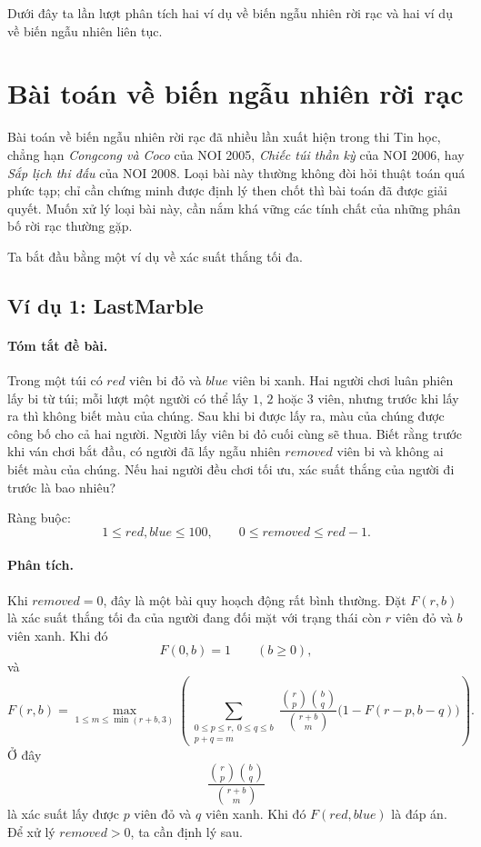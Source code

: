 \documentclass[11pt]{article}
\begin{document}
Dưới đây ta lần lượt phân tích hai ví dụ về biến ngẫu nhiên rời rạc và hai ví
dụ về biến ngẫu nhiên liên tục.

\section{Bài toán về biến ngẫu nhiên rời rạc}

Bài toán về biến ngẫu nhiên rời rạc đã nhiều lần xuất hiện trong thi Tin học,
chẳng hạn \emph{Congcong và Coco} của NOI 2005, \emph{Chiếc túi thần kỳ} của
NOI 2006, hay \emph{Sắp lịch thi đấu} của NOI 2008. Loại bài này thường không
đòi hỏi thuật toán quá phức tạp; chỉ cần chứng minh được định lý then chốt thì
bài toán đã được giải quyết. Muốn xử lý loại bài này, cần nắm khá vững các
tính chất của những phân bố rời rạc thường gặp.

Ta bắt đầu bằng một ví dụ về xác suất thắng tối đa.

\subsection{Ví dụ 1: LastMarble}

\paragraph{Tóm tắt đề bài.}
Trong một túi có \(\mathit{red}\) viên bi đỏ và \(\mathit{blue}\) viên bi
xanh. Hai người chơi luân phiên lấy bi từ túi; mỗi lượt một người có thể lấy
\(1\), \(2\) hoặc \(3\) viên, nhưng trước khi lấy ra thì không biết màu của
chúng. Sau khi bi được lấy ra, màu của chúng được công bố cho cả hai người.
Người lấy viên bi đỏ cuối cùng sẽ thua. Biết rằng trước khi ván chơi bắt đầu,
có người đã lấy ngẫu nhiên \(\mathit{removed}\) viên bi và không ai biết màu
của chúng. Nếu hai người đều chơi tối ưu, xác suất thắng của người đi trước là
bao nhiêu?

Ràng buộc:
\[
  1\le \mathit{red},\mathit{blue}\le 100,\qquad
  0\le \mathit{removed}\le \mathit{red}-1.
\]

\paragraph{Phân tích.}
Khi \(\mathit{removed}=0\), đây là một bài quy hoạch động rất bình thường.
Đặt \(F(r,b)\) là xác suất thắng tối đa của người đang đối mặt với trạng thái
còn \(r\) viên đỏ và \(b\) viên xanh. Khi đó
\[
  F(0,b)=1\qquad (b\ge 0),
\]
và
\[
  F(r,b)=
  \max_{1\le m\le \min(r+b,3)}
  \left(
    \sum_{\substack{0\le p\le r,\ 0\le q\le b\\p+q=m}}
    \frac{\binom{r}{p}\binom{b}{q}}{\binom{r+b}{m}}
    \bigl(1-F(r-p,b-q)\bigr)
  \right).
  \tag{1}
\]
Ở đây
\[
  \frac{\binom{r}{p}\binom{b}{q}}{\binom{r+b}{m}}
\]
là xác suất lấy được \(p\) viên đỏ và \(q\) viên xanh. Khi đó
\(F(\mathit{red},\mathit{blue})\) là đáp án. Để xử lý
\(\mathit{removed}>0\), ta cần định lý sau.
\end{document}

